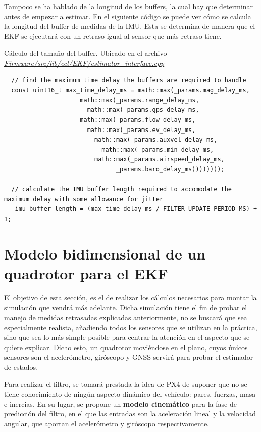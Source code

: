 
Tampoco se ha hablado de la longitud de los buffers, la cual hay que determinar antes de empezar a estimar. En el siguiente código se puede ver cómo se calcula la longitud del buffer de medidas de la IMU. Esta se determina de manera que el EKF se ejecutará con un retraso igual al sensor que más retraso tiene.
\begin{codigo}{Cálculo del tamaño del buffer. Ubicado en el archivo \href{https://github.com/PX4/PX4-ECL/blob/ec934908900b23ee273d1a9f82364b7b38423200/EKF/estimator_interface.cpp\#L513}{\textit{Firmware/src/lib/ecl/EKF/estimator\_interface.cpp}}}
\begin{verbatim}
  // find the maximum time delay the buffers are required to handle
  const uint16_t max_time_delay_ms = math::max(_params.mag_delay_ms,
  				     math::max(_params.range_delay_ms,
  				       math::max(_params.gps_delay_ms,
  					 math::max(_params.flow_delay_ms,
  					   math::max(_params.ev_delay_ms,
  					     math::max(_params.auxvel_delay_ms,
  					       math::max(_params.min_delay_ms,
  						 math::max(_params.airspeed_delay_ms,
  						       _params.baro_delay_ms))))))));
  
  // calculate the IMU buffer length required to accomodate the maximum delay with some allowance for jitter
  _imu_buffer_length = (max_time_delay_ms / FILTER_UPDATE_PERIOD_MS) + 1;
\end{verbatim}
\end{codigo} 


\section{Modelo bidimensional de un quadrotor para el EKF}
El objetivo de esta sección, es el de realizar los cálculos necesarios para montar la simulación que vendrá más adelante. Dicha simulación tiene el fin de probar el manejo de medidas retrasadas explicadas anteriormente, no se buscará que sea especialmente realista, añadiendo todos los sensores que se utilizan en la práctica, sino que sea lo más simple posible para centrar la atención en el aspecto que se quiere explicar. Dicho esto, un quadrotor moviéndose en el plano, cuyos únicos sensores son el acelerómetro, giróscopo y GNSS servirá para probar el estimador de estados. 

Para realizar el filtro, se tomará prestada la idea de PX4 de suponer que no se tiene conocimiento de ningún aspecto dinámico del vehículo: pares, fuerzas, masa e inercias. En su lugar, se propone un \textbf{modelo cinemático} para la fase de predicción del filtro, en el que las entradas son la aceleración lineal y la velocidad angular, que aportan el acelerómetro y giróscopo respectivamente.

